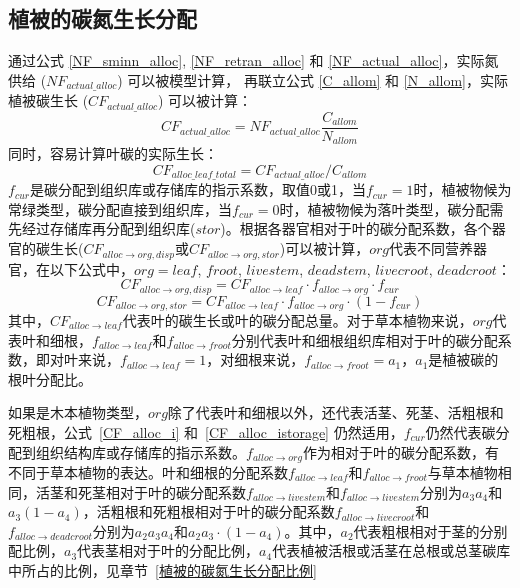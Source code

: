 \subsection{植被的碳氮生长分配}\label{植被的碳氮生长分配}
通过公式 \eqref{NF_sminn_alloc}, \eqref{NF_retran_alloc} 和 \eqref{NF_actual_alloc}，实际氮供给 ($NF_{actual\_alloc}$) 可以被模型计算，
再联立公式 \eqref{C_allom} 和 \eqref{N_allom}，实际植被碳生长 ($CF_{actual\_alloc}$) 可以被计算：
\begin{equation}
  CF_{actual\_alloc} = NF_{actual\_alloc}\frac{C_{allom}}{N_{allom}}
\end{equation}
同时，容易计算叶碳的实际生长：
\begin{equation}
  CF_{alloc\_leaf\_total} = CF_{actual\_alloc}/C_{allom}
\end{equation}
$f_{cur}$是碳分配到组织库或存储库的指示系数，取值0或1，当$f_{cur}=1$时，植被物候为常绿类型，碳分配直接到组织库，当$f_{cur}=0$时，植被物候为落叶类型，碳分配需先经过存储库再分配到组织库($stor$)。根据各器官相对于叶的碳分配系数，各个器官的碳生长($CF_{alloc\rightarrow org,disp}$或$CF_{alloc\rightarrow org,stor}$)可以被计算，$org$代表不同营养器官，在以下公式中，$org=leaf$, $froot$, $livestem$, $deadstem$, $livecroot$, $deadcroot$：
\begin{equation}\label{CF_alloc_i}
  CF_{alloc\rightarrow org,disp} = CF_{alloc\rightarrow leaf}\cdot f_{alloc\rightarrow org} \cdot f_{cur}
\end{equation}
\begin{equation}\label{CF_alloc_istorage}
  CF_{alloc\rightarrow org,stor} = CF_{alloc\rightarrow leaf}\cdot f_{alloc\rightarrow org} \cdot \left(1-f_{cur}\right)
\end{equation}
其中，$CF_{alloc\rightarrow leaf}$代表叶的碳生长或叶的碳分配总量。对于草本植物来说，$org$代表叶和细根，$f_{alloc\rightarrow leaf}$和$f_{alloc\rightarrow froot}$分别代表叶和细根组织库相对于叶的碳分配系数，即对叶来说，$f_{alloc\rightarrow leaf}=1$，对细根来说，$f_{alloc\rightarrow froot}=a_1$，$a_1$是植被碳的根叶分配比。

如果是木本植物类型，$org$除了代表叶和细根以外，还代表活茎、死茎、活粗根和死粗根，公式~\eqref{CF_alloc_i} 和~\eqref{CF_alloc_istorage} 仍然适用，$f_{cur}$仍然代表碳分配到组织结构库或存储库的指示系数。$f_{alloc\rightarrow org}$作为相对于叶的碳分配系数，有不同于草本植物的表达。叶和细根的分配系数$f_{alloc\rightarrow leaf}$和$f_{alloc\rightarrow froot}$与草本植物相同，活茎和死茎相对于叶的碳分配系数$f_{alloc\rightarrow livestem}$和$f_{alloc\rightarrow livestem}$分别为$a_3a_4$和$a_3\left(1-a_4\right)$，活粗根和死粗根相对于叶的碳分配系数$f_{alloc\rightarrow livecroot}$和$f_{alloc\rightarrow deadcroot}$分别为$a_2a_3a_4$和$a_2a_3\cdot \left(1-a_4\right)$。其中，$a_2$代表粗根相对于茎的分别配比例，$a_3$代表茎相对于叶的分配比例，$a_4$代表植被活根或活茎在总根或总茎碳库中所占的比例，见章节~\ref{植被的碳氮生长分配比例}

